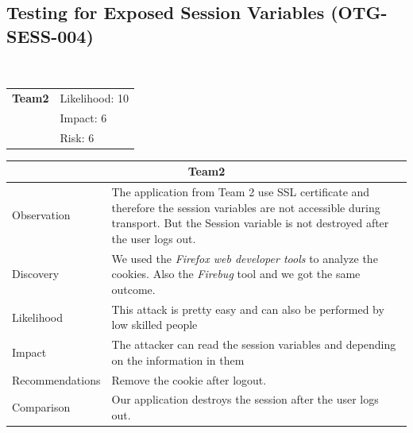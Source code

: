 \documentclass[headsepline,footsepline,footinclude=false,oneside,fontsize=11pt,paper=a4,listof=totoc,bibliography=totoc]{scrbook} %
\begin{document}
\subsection{Testing for Exposed Session Variables (OTG-SESS-004)}\

\begin{tabular}{cR{12cm}}
	\textbf{Team2} & Likelihood: 10\\& Impact: 6\\& Risk: 6
\end{tabular}

\begin{tabular}{ l|p{11cm}  }
	\hline
	\multicolumn{2}{c}{\textbf{Team2}} \\
	\hline
	Observation & The application from Team 2  use SSL certificate and therefore the session variables
	are not accessible during transport. But the Session variable is not destroyed after the user logs out.\\
	Discovery & We used the \textit{Firefox web developer tools} to analyze the cookies. Also the \textit{Firebug} tool and we got the same outcome. \\
	Likelihood & This attack is pretty easy and can also be performed by low skilled people\\
	Impact & The attacker can read the session variables and depending on the information in them  \\
	Recommendations & Remove the cookie after logout.\\
	Comparison & Our application destroys the session after the user logs out.\\
	\hline
\end{tabular}
\\
\vspace{0.5cm}
\\
\end{document}
